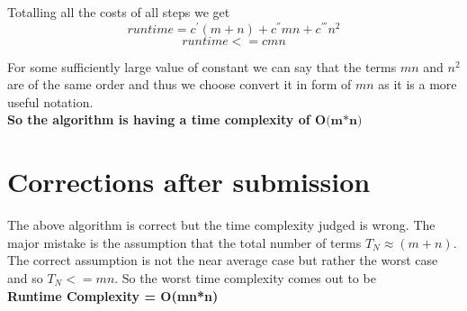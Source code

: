 \documentclass[20pt]{article}
\begin{document}
Totalling all the costs of all steps we get
\begin{equation} runtime = c^{'}(m+n) + c^{''}mn + c^{'''}n^2 \end{equation}
\begin{equation} runtime <= cmn \end{equation}

For some sufficiently large value of constant we can say that the terms $ mn $ and $ n^2 $  are of the same order and thus we choose convert it in form of $ mn $ as it is a more useful notation. \\
\textbf{So the algorithm is having a time complexity of $ \textbf{O(m*n)} $}

\section{Corrections after submission}
The above algorithm is correct but the time complexity judged is wrong. The major mistake is the assumption that the total number of terms $T_N \approx (m+n)$. The correct assumption is not the near average case but rather the worst case and so $T_N<=mn$. So the worst time complexity comes out to be \\
\textbf{Runtime Complexity = O(mn*n)}
\end{document}
